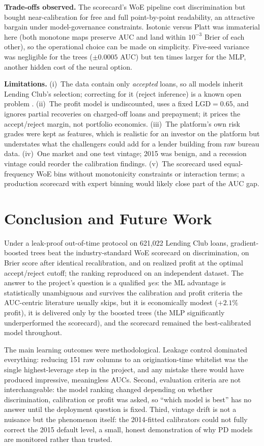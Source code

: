 \documentclass[a4paper,twocolumn,10pt]{article}
\begin{document}
\textbf{Trade-offs observed.} The scorecard's WoE pipeline cost discrimination but bought near-calibration for free and full point-by-point readability, an attractive bargain under model-governance constraints. Isotonic versus Platt was immaterial here (both monotone maps preserve AUC and land within $10^{-3}$ Brier of each other), so the operational choice can be made on simplicity. Five-seed variance was negligible for the trees ($\pm 0.0005$ AUC) but ten times larger for the MLP, another hidden cost of the neural option.

\textbf{Limitations.} (i)~The data contain only \emph{accepted} loans, so all models inherit Lending Club's selection; correcting for it (reject inference) is a known open problem \cite{hand1997}. (ii)~The profit model is undiscounted, uses a fixed $\mathrm{LGD}=0.65$, and ignores partial recoveries on charged-off loans and prepayment; it prices the accept/reject margin, not portfolio economics. (iii)~The platform's own risk grades were kept as features, which is realistic for an investor on the platform but understates what the challengers could add for a lender building from raw bureau data. (iv)~One market and one test vintage; 2015 was benign, and a recession vintage could reorder the calibration findings. (v)~The scorecard used equal-frequency WoE bins without monotonicity constraints or interaction terms; a production scorecard with expert binning would likely close part of the AUC gap.

\section{Conclusion and Future Work}

Under a leak-proof out-of-time protocol on 621{,}022 Lending Club loans, gradient-boosted trees beat the industry-standard WoE scorecard on discrimination, on Brier score after identical recalibration, and on realized profit at the optimal accept/reject cutoff; the ranking reproduced on an independent dataset. The answer to the project's question is a qualified \emph{yes}: the ML advantage is statistically unambiguous and survives the calibration and profit criteria the AUC-centric literature usually skips, but it is economically modest ($+2.1\%$ profit), it is delivered only by the boosted trees (the MLP significantly underperformed the scorecard), and the scorecard remained the best-calibrated model throughout.

The main learning outcomes were methodological. Leakage control dominated everything: reducing 151 raw columns to an origination-time whitelist was the single highest-leverage step in the project, and any mistake there would have produced impressive, meaningless AUCs. Second, evaluation criteria are not interchangeable: the model ranking changed depending on whether discrimination, calibration or profit was asked, so ``which model is best'' has no answer until the deployment question is fixed. Third, vintage drift is not a nuisance but the phenomenon itself: the 2014-fitted calibrators could not fully correct the 2015 default level, a small, honest demonstration of why PD models are monitored rather than trusted.
\end{document}
